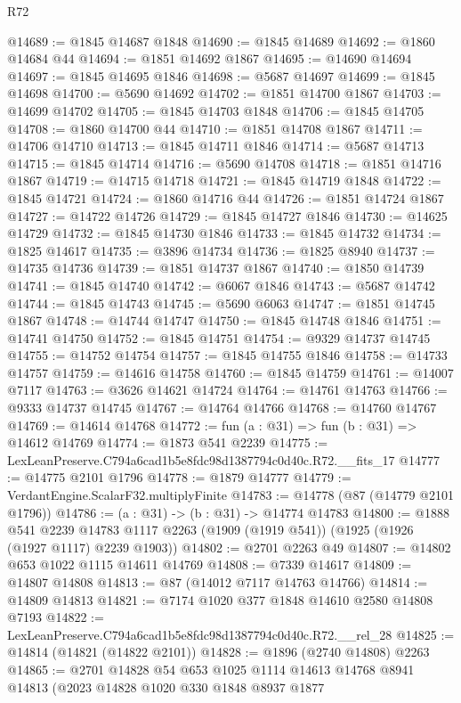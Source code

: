\begin{lexlean}{R72}
\begin{coremodule}
@14689 := @1845 @14687 @1848
@14690 := @1845 @14689
@14692 := @1860 @14684 @44
@14694 := @1851 @14692 @1867
@14695 := @14690 @14694
@14697 := @1845 @14695 @1846
@14698 := @5687 @14697
@14699 := @1845 @14698
@14700 := @5690 @14692
@14702 := @1851 @14700 @1867
@14703 := @14699 @14702
@14705 := @1845 @14703 @1848
@14706 := @1845 @14705
@14708 := @1860 @14700 @44
@14710 := @1851 @14708 @1867
@14711 := @14706 @14710
@14713 := @1845 @14711 @1846
@14714 := @5687 @14713
@14715 := @1845 @14714
@14716 := @5690 @14708
@14718 := @1851 @14716 @1867
@14719 := @14715 @14718
@14721 := @1845 @14719 @1848
@14722 := @1845 @14721
@14724 := @1860 @14716 @44
@14726 := @1851 @14724 @1867
@14727 := @14722 @14726
@14729 := @1845 @14727 @1846
@14730 := @14625 @14729
@14732 := @1845 @14730 @1846
@14733 := @1845 @14732
@14734 := @1825 @14617
@14735 := @3896 @14734
@14736 := @1825 @8940
@14737 := @14735 @14736
@14739 := @1851 @14737 @1867
@14740 := @1850 @14739
@14741 := @1845 @14740
@14742 := @6067 @1846
@14743 := @5687 @14742
@14744 := @1845 @14743
@14745 := @5690 @6063
@14747 := @1851 @14745 @1867
@14748 := @14744 @14747
@14750 := @1845 @14748 @1846
@14751 := @14741 @14750
@14752 := @1845 @14751
@14754 := @9329 @14737 @14745
@14755 := @14752 @14754
@14757 := @1845 @14755 @1846
@14758 := @14733 @14757
@14759 := @14616 @14758
@14760 := @1845 @14759
@14761 := @14007 @7117
@14763 := @3626 @14621 @14724
@14764 := @14761 @14763
@14766 := @9333 @14737 @14745
@14767 := @14764 @14766
@14768 := @14760 @14767
@14769 := @14614 @14768
@14772 := fun (a : @31) => fun (b : @31) => @14612 @14769
@14774 := @1873 @541 @2239
@14775 := LexLeanPreserve.C794a6cad1b5e8fdc98d1387794c0d40c.R72.__fits_17
@14777 := @14775 @2101 @1796
@14778 := @1879 @14777
@14779 := VerdantEngine.ScalarF32.multiplyFinite
@14783 := @14778 (@87 (@14779 @2101 @1796))
@14786 := (a : @31) -> (b : @31) -> @14774 @14783
@14800 := @1888
    @541
    @2239
    @14783
    @1117
    @2263
    (@1909 (@1919 @541))
    (@1925 (@1926 (@1927 @1117) @2239 @1903))
@14802 := @2701 @2263 @49
@14807 := @14802 @653 @1022 @1115 @14611 @14769
@14808 := @7339 @14617
@14809 := @14807 @14808
@14813 := @87 (@14012 @7117 @14763 @14766)
@14814 := @14809 @14813
@14821 := @7174 @1020 @377 @1848 @14610 @2580 @14808 @7193
@14822 := LexLeanPreserve.C794a6cad1b5e8fdc98d1387794c0d40c.R72.__rel_28
@14825 := @14814 (@14821 (@14822 @2101))
@14828 := @1896 (@2740 @14808) @2263
@14865 := @2701
    @14828
    @54
    @653
    @1025
    @1114
    @14613
    @14768
    @8941
    @14813
    (@2023
      @14828
      @1020
      @330
      @1848
      @8937
      @1877

\end{coremodule}
\end{lexlean}

